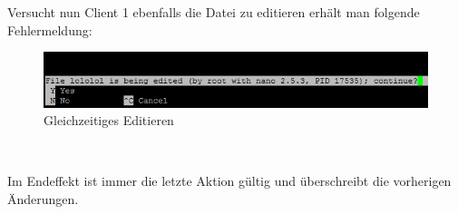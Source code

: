 Versucht nun Client 1 ebenfalls die Datei zu editieren erhält man folgende Fehlermeldung:
\begin{figure}[!h]
	\begin{center}
		\includegraphics[width=0.8\linewidth]{images/error.png}
		\caption{Gleichzeitiges Editieren}
		\label{error}
	\end{center}
\end{figure}\

Im Endeffekt ist immer die letzte Aktion gültig und überschreibt die vorherigen Änderungen.